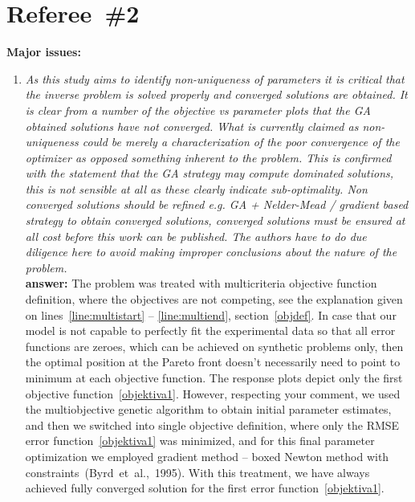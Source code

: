 \documentclass[final,3p]{elsarticle}
\begin{document}
\section*{Referee~\#2}

{\bf Major issues:}

\begin{enumerate}[label={\bf \Roman*}]
\item {\it As this study aims to identify non-uniqueness of parameters it is critical that the inverse problem is solved properly and converged solutions are obtained. It is clear from a number of the objective vs parameter plots that the GA obtained solutions have not converged. What is currently claimed as non-uniqueness could be merely a characterization of the poor convergence of the optimizer as opposed something inherent to the problem. This is confirmed with the statement that the GA strategy may compute dominated solutions, this is not sensible at all as these clearly indicate sub-optimality. Non converged solutions should be refined e.g. GA + Nelder-Mead / gradient based strategy to obtain converged solutions, converged solutions must be ensured at all cost before this work can be published. The authors have to do due diligence here
 to avoid making improper conclusions about the nature of the problem.} \\
{\bf answer:} The problem was treated with multicriteria objective function definition, where the objectives are not competing, see the explanation given on lines~\ref{line:multistart} -- \ref{line:multiend}, section~\ref{objdef}. In case that our model is not capable to perfectly fit the experimental data so that all error functions are zeroes, which can be achieved on synthetic problems only, then the optimal position at the Pareto front doesn't necessarily need to point to minimum at each  objective function. The response plots depict only the first objective function~\eqref{objektiva1}. However, respecting your comment, we used the multiobjective  genetic algorithm to obtain initial parameter estimates, and then we switched into single objective definition, where only the RMSE error function~\eqref{objektiva1} was minimized, and for this final parameter optimization we employed gradient method -- boxed Newton method with constraints~(Byrd~et~al.,~1995). With this treatment, we have always achieved fully converged solution for the first error function~\eqref{objektiva1}.


\end{enumerate}
\end{document}
